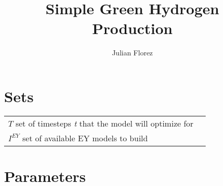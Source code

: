 \documentclass[12 pt]{article}
\begin{document}
\title{Simple Green Hydrogen Production}
\author{Julian Florez}
\maketitle


\section*{Sets}

\begin{tabular}{ll}
$T$ set of timesteps \textit{t} that the model will optimize for\\
$I^{EY}$ set of available EY models to build \\

\end{tabular}

\section*{Parameters}
\end{document}
